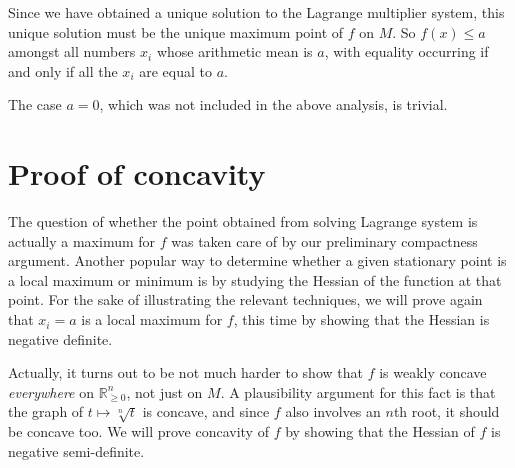 \documentclass[12pt]{article}
\newcommand{\real}{\mathbb{R}}
\begin{document}
Since we have obtained a unique solution to the Lagrange multiplier system,
this unique solution must be the unique maximum point of $f$ on $M$.
So $f(x) \leq a$ amongst all numbers $x_i$ whose arithmetic mean is $a$,
with equality occurring if and only if all the $x_i$ are equal to $a$. 

The case $a = 0$, which was not included in the above analysis, is trivial.

%
%

\section*{Proof of concavity}
The question of whether the point obtained from solving Lagrange system
is actually a maximum for $f$ was taken care of by our preliminary compactness argument. Another popular way to determine whether a given stationary point
is a local maximum or minimum is by studying the Hessian of the function
at that point.
For the sake of illustrating the relevant techniques,
we will prove again that $x_i = a$ is a local maximum for $f$,
this time by showing that the Hessian is negative definite.

Actually, it turns out to be not much
harder to show that $f$ is weakly concave \emph{everywhere}
on $\real_{\geq 0}^n$, not just on $M$.
A plausibility argument for this fact
is that the graph of $t \mapsto \sqrt[n]{t}$
is concave, and since $f$ also involves an $n$th root,
it should be concave too.  We will prove concavity of $f$ by
showing that the Hessian of $f$ is negative semi-definite.
\end{document}
